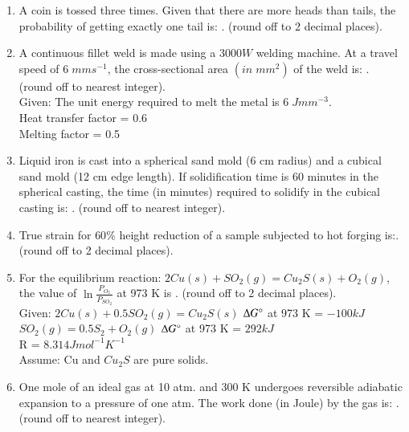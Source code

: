 \documentclass[journal]{IEEEtran}
\theoremstyle{remark}
\begin{document}
\begin{enumerate}[resume]
\item A coin is tossed three times. Given that there are more heads than tails, the
probability of getting exactly one tail is: \underline {\hspace{2cm}}. (round off to 2 decimal places). \hfill{}

\item A continuous fillet weld is made using a $3000 W$ welding machine. At a
travel speed of $6 \;mm s^{-1}$, the cross-sectional area $(in\; mm^2)$ of the weld is: \underline {\hspace{2cm}}. (round off to nearest integer).\\
Given: The unit energy required to melt the metal is $6\; J mm^{-3}$.\\
Heat transfer factor = 0.6\\
Melting factor = 0.5
\hfill{}

\item Liquid iron is cast into a spherical sand mold (6 cm radius) and a cubical
sand mold (12 cm edge length). If solidification time is 60 minutes in the
spherical casting, the time (in minutes) required to solidify in the cubical
casting is:  \underline {\hspace{2cm}}. (round off to nearest integer).  \hfill{}

\item True strain for $60\%$ height reduction of a sample subjected to hot forging
is:\underline {\hspace{2cm}}. (round off to 2 decimal places). \hfill{}

\item For the equilibrium reaction: $2Cu{(s)}+SO_2{(g)} = Cu_2S{(s)} +O_2{(g)}$, the
value of $\ln{\frac{P_{O_2}}{P_{SO_2}}}$ at 973 K is  \underline {\hspace{2cm}}. (round off to 2 decimal places).\\
Given: $2Cu{(s)}+0.5SO_2{(g)} = Cu_2S{(s)} $ $\Delta G\degree$ at 973 K = $-100 kJ$\\
$SO_2{(g)} = 0.5S_2 +O_2{(g)}$ $\Delta G\degree $ at 973 K = $292 kJ$\\
R = $8.314 J mol^{-1} K^{-1}$\\
Assume: Cu and $Cu_2S$ are pure solids.
\hfill{}

\item One mole of an ideal gas at 10 atm. and 300 K undergoes reversible
adiabatic expansion to a pressure of one atm. The work done (in Joule) by
the gas is: \underline {\hspace{2cm}}. (round off to nearest integer). \hfill{}


\end{enumerate}
\end{document}
